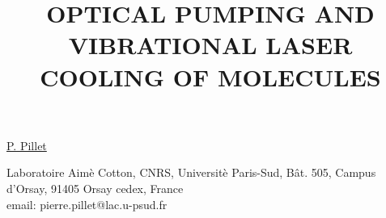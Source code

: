 \title{OPTICAL PUMPING AND VIBRATIONAL LASER COOLING OF MOLECULES}

\underline{P. Pillet}


Laboratoire Aim\`e Cotton, CNRS, Universit\`e Paris-Sud, B\^at. 505, Campus d'Orsay, 91405 Orsay cedex, France\\
email: pierre.pillet@lac.u-psud.fr

\vspace{\baselineskip}